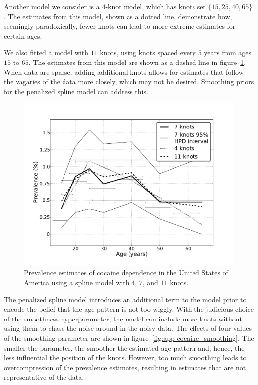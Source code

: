 Another model we consider is a $4$-knot model, which has knots  set $\{15, 25,
40, 65\}$.  The estimates from this model, shown as a dotted line,
demonstrate how, seemingly paradoxically, fewer knots can lead to more
extreme estimates for certain ages.

We also fitted a model with $11$ knots, using knots spaced every $5$ years from
ages $15$ to $65$.
The estimates from this model are shown as a dashed line in
figure~\ref{fig:app-cocaine_knots}.  When data are sparse, adding
additional knots allows for estimates that follow the vagaries of the
data more closely, which may not be desired.  Smoothing priors for the
penalized spline model can address this.

    \begin{figure}[h]
        \begin{center}
            \includegraphics[width=\textwidth]{applications/cocaine_dependence-knots.pdf}
            \caption[Prevalence estimates of cocaine dependence using spline 
            models with varying numbers of knots.]{Prevalence estimates of cocaine dependence in the United States of America using a spline model with $4$, $7$, and $11$ knots. }
            \label{fig:app-cocaine_knots}
        \end{center}
    \end{figure}

The penalized spline model introduces an additional term to the model
prior to encode the belief that the age pattern is not too wiggly.
With the judicious choice of the smoothness hyperparameter, the model
can include more knots without using them to chase the noise around in
the noisy data.  The effects of four values of the smoothing parameter
are shown in figure~\ref{fig:app-cocaine_smoothing}.  The smaller the
parameter, the smoother the estimated age pattern and, hence, the less
influential the position of the knots.  However, too much smoothing
leads to overcompression of the prevalence estimates, resulting in estimates
that are not representative of the data.

